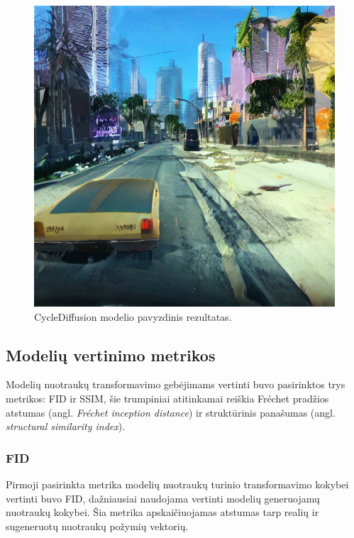 \documentclass{VUMIFPSbakalaurinis}
\begin{document}
            \begin{figure}[H]
                \centering
                \includegraphics[scale=0.7]{img/diffusion/cycle/512}
                \caption{CycleDiffusion modelio pavyzdinis rezultatas.}
                \label{img:cycle}
            \end{figure}
            
    \subsection{Modelių vertinimo metrikos}
        Modelių nuotraukų transformavimo gebėjimams vertinti buvo pasirinktos trys metrikos: FID ir SSIM, šie trumpiniai atitinkamai reiškia Fréchet pradžios atstumas (angl. \emph{Fréchet inception distance}) ir struktūrinis panašumas (angl. \emph{structural similarity index}).
        
        \subsubsection{FID}
            Pirmoji pasirinkta metrika modelių nuotraukų turinio transformavimo kokybei vertinti buvo FID, dažniausiai naudojama vertinti modelių generuojamų nuotraukų kokybei. Šia metrika apskaičiuojamas atstumas tarp realių ir sugeneruotų nuotraukų požymių vektorių.
    
\end{document}
